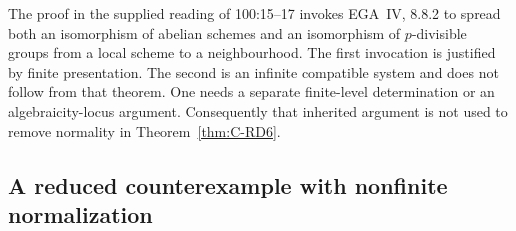 \begin{remark}\label{auto:C:4b7cbcb1fe87}

The proof in the supplied reading of 100:15--17 invokes EGA~IV, 8.8.2
to spread both an isomorphism of abelian schemes and an isomorphism of
$p$-divisible groups from a local scheme to a neighbourhood. The first
invocation is justified by finite presentation. The second is an
infinite compatible system and does not follow from that theorem.
One needs a separate finite-level determination or an algebraicity-locus
argument. Consequently that inherited argument is not used to remove
normality in Theorem~\ref{thm:C-RD6}.
\end{remark}

\subsection{A reduced counterexample with nonfinite normalization}

